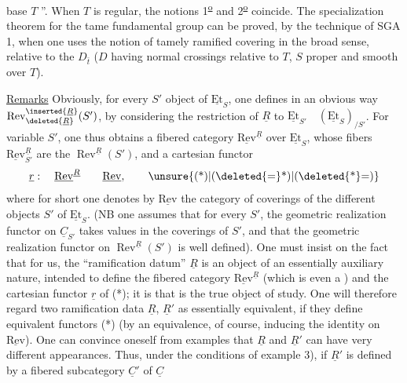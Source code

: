 base $T$ ''. When $T$ is regular, the notions 1\textsuperscript{\uline{o}} and 2\textsuperscript{\uline{o}} coincide. The specialization theorem for the tame fundamental group can be proved, by the technique of SGA 1, when one uses the notion of tamely ramified covering in the broad sense, relative to the $D_{\bar{t}}$  ($D$ having normal crossings relative to $T$, $S$ proper and smooth over $T$).

\uline{Remarks} Obviously, for every $S'$ object of $\underline{\mathrm{Et}}_S$, one defines in an obvious way $\operatorname{Rev}_{\deleted{\underline{R}}}^{\inserted{\underline{R}}}(S')$, by considering the restriction of $\underline{R}$ to $\underline{\mathrm{Et}}_{S'}\quad(\underline{\mathrm{Et}}_S)_{/S'}$. For variable $S'$, one thus obtains a fibered category $\underline{\mathrm{Rev}}^{\underline{R}}$ over $\underline{\mathrm{Et}}_S$, whose fibers $\underline{\mathrm{Rev}}_{S'}^{\underline{R}}$ are the $\operatorname{Rev}^{\underline{R}}(S')$, and a cartesian functor
\[
\underline{r}:\quad\underline{\mathrm{Rev}}^{\underline{R}}\qquad\underline{\mathrm{Rev}},
\tag*{\unsure{(*)|(\deleted{=}*)|(\deleted{*}=)}}
\]
where for short one denotes by $\underline{\mathrm{Rev}}$ the category  of coverings of the different objects $S'$ of $\underline{\mathrm{Et}}_S$. (NB one assumes that for every $S'$, the geometric realization functor on $\underline{C}_{S'}$ takes values in the coverings of $S'$, and that the geometric realization functor on $\operatorname{Rev}^{\underline{R}}(S')$ is well defined). One must insist on the fact that for us, the ``ramification datum'' $\underline{R}$ is an object of an essentially auxiliary nature, intended to define the fibered category $\underline{\mathrm{Rev}}^{\underline{R}}$ (which is even a \uline{}) and the cartesian functor $\underline{r}$ of (*); it is \unsure{(*)|(\deleted{=}*)|(\deleted{*}=)} that is the true object of study. One will therefore regard two ramification data $\underline{R}$, $\underline{R}'$ as essentially equivalent, if they define equivalent functors (*) (by an equivalence, of course, inducing the identity on $\underline{\mathrm{Rev}}$). One can convince oneself from examples that $\underline{R}$ and $\underline{R}'$ can have very different appearances. Thus, under the conditions of example 3), if $\underline{R}'$ is defined by a fibered subcategory  $\underline{C}'$ of $\underline{C}$
